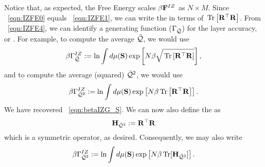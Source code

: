 Notice that, as expected, the Free Energy scales $\beta\mathbf{F}^{IZ}$ as $N \times M$.
\noindent
Since \EQN~\ref{eqn:IZFE0} equals \EQN~\ref{eqn:IZFE1}, we can write the \FreeEnergy in terms of $\mbox{}\operatorname{Tr}\left[\mathbf{R}^{\top}\mathbf{R}\right]$. From \EQN~\ref{eqn:IZFE4}, 
we can identify a generating function ($\Gamma_{\bar{\mathcal{Q}}}$) for the layer accuracy, or \Quality.
For example, to compute the average \Quality $\bar{\mathcal{Q}}$, we would use
\begin{align}
  \label{eqn:IZG_Q}
  \beta\Gamma^{IZ}_{\bar{\mathcal{Q}}} :=  \ln \int d\mu(\mathbf{S}) \exp\left[N\beta\sqrt{\mbox{}\operatorname{Tr}\left[\mathbf{R}^{\top}\mathbf{R}\right]}\right],
\end{align}
and to compute the average \Quality (squared) $\bar{\mathcal{Q}}^{2}$, we would use
\begin{align}
    \label{eqn:IZG_QT2}
  \beta\Gamma^{IZ}_{\bar{\mathcal{Q}}^{2}} :=  \ln \int d\mu(\mathbf{S}) \exp\left[N\beta\mbox{}\operatorname{Tr}\left[\mathbf{R}^{\top}\mathbf{R}\right]\right] .
\end{align}
We have recovered \EQN~\ref{eqn:betaIZG_S}.
We can now also define the \LayerQualitySquared \Hamiltonian as
\begin{equation}
      \label{eqn:HBARE}
  \mathbf{H}_{\bar{\mathcal{Q}}^{2}}:=\mathbf{R}^{\top}\mathbf{R}
\end{equation}
which is a symmetric operator, as desired.
Consequently, we may also write
\begin{align}
    \label{eqn:IZG_QT3}
  \beta\Gamma^{IZ}_{\bar{\mathcal{Q}}^{2}} :=  \ln \int d\mu(\mathbf{S}) \exp\left[N\beta \operatorname{Tr}[\mathbf{H}_{\bar{\mathcal{Q}}^{2}}]\right]  .
\end{align}
